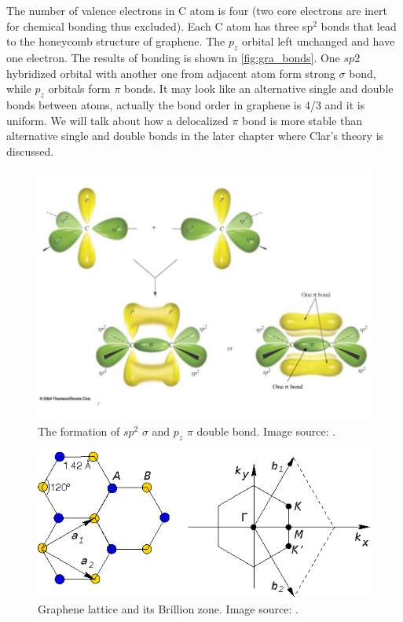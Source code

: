 The number of valence electrons in C atom is four (two core electrons are inert for chemical bonding thus excluded). Each C atom has three sp$^2$ bonds that lead to the honeycomb structure of graphene. The $p_z$ orbital left unchanged and have one electron. The results of bonding is shown in \autoref{fig:gra_bonds}. One $sp2$ hybridized orbital with another one from adjacent atom form strong $\sigma$ bond, while $p_z$ orbitals form $\pi$ bonds. It may look like an alternative single and double bonds between atoms, actually the bond order in graphene is 4/3 and it is uniform. We will talk about how a delocalized $\pi$ bond is more stable than alternative single and double bonds in the later chapter where Clar's theory is discussed.

\begin{figure}[htbp!] 
\centering  
\includegraphics[width=\textwidth]{double_bond}
\caption{The formation of $sp^2$ $\sigma$ and $p_z$ $\pi$ double bond. Image source: \cite{gra_bond}. }  
\label{fig:gra_bonds}
\end{figure} 



\begin{figure}[htbp!] 
\centering  
\includegraphics[width=\textwidth]{gra_lat.eps}
\caption{Graphene lattice and its Brillion zone. Image source: \cite{CastroNeto2009}. }  
\label{fig:gra_lat}
\end{figure} 

